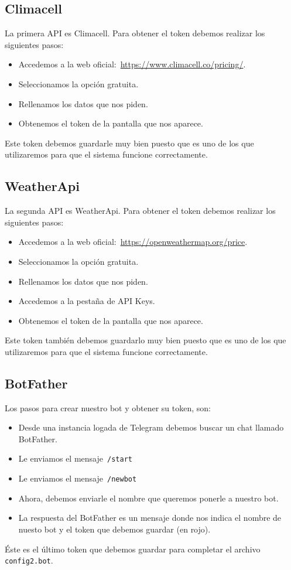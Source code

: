 \subsection{Climacell}
La primera API es Climacell. Para obtener el token debemos realizar los siguientes pasos:
\begin{itemize}
    \item Accedemos a la web oficial:~\url{https://www.climacell.co/pricing/}.
    \item Seleccionamos la opción gratuita.
    \item Rellenamos los datos que nos piden.
    \item Obtenemos el token de la pantalla que nos aparece.
\end{itemize}
Este token debemos guardarle muy bien puesto que es uno de los que utilizaremos para que el sistema funcione correctamente.

\subsection{WeatherApi}
La segunda API es WeatherApi. Para obtener el token debemos realizar los siguientes pasos:
\begin{itemize}
    \item Accedemos a la web oficial:~\url{https://openweathermap.org/price}.
    \item Seleccionamos la opción gratuita.
    \item Rellenamos los datos que nos piden.
    \item Accedemos a la pestaña de API Keys.
    \item Obtenemos el token de la pantalla que nos aparece.
\end{itemize}
Este token también debemos guardarlo muy bien puesto que es uno de los que utilizaremos para que el sistema funcione correctamente.

\subsection{BotFather}
Los pasos para crear nuestro bot y obtener su token, son:
\begin{itemize}
    \item Desde una instancia logada de Telegram debemos buscar un chat llamado BotFather.
    \item Le enviamos el mensaje~\texttt{/start}
    \item Le enviamos el mensaje~\texttt{/newbot}
    \item Ahora, debemos enviarle el nombre que queremos ponerle a nuestro bot.
    \item La respuesta del BotFather es un mensaje donde nos indica el nombre de nuesto bot y el token que debemos guardar (en rojo).
\end{itemize}
Éste es el último token que debemos guardar para completar el archivo \texttt{config2.bot}.

